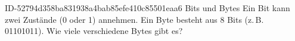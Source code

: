 \begin{exercise}
      {ID-52794d358ba831938a4bab85efe410c85501eaa6}
      {Bits und Bytes}
  \ifproblem\problem
    Ein Bit kann zwei Zustände (0 oder 1) annehmen. Ein Byte besteht aus 8 Bits
    (z.\,B. 01101011). Wie viele verschiedene Bytes gibt es?
  \fi
\end{exercise}
